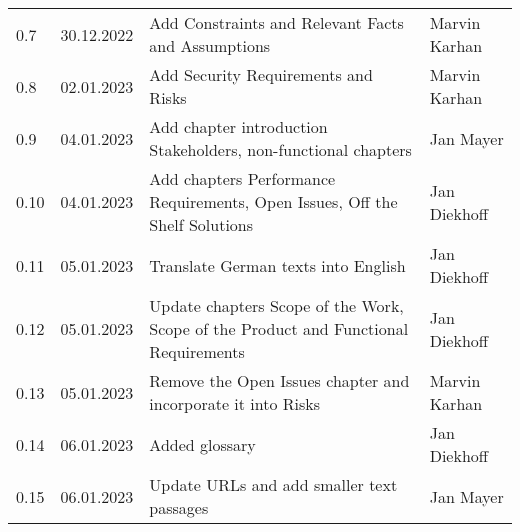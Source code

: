 \begin{footnotesize}
\begin{longtable}[L L L L]{ p{} p{} p{} p{} }
    0.7              & 30.12.2022    & Add Constraints and Relevant Facts and Assumptions                                                                                            & Marvin Karhan   \\

    \rowcolor{Gray}
    0.8              & 02.01.2023    & Add Security Requirements and Risks                                                                                                           & Marvin Karhan   \\

    0.9              & 04.01.2023    & Add chapter introduction Stakeholders, non-functional chapters                                                                                & Jan Mayer       \\

    \rowcolor{Gray}
    0.10             & 04.01.2023    & Add chapters Performance Requirements, Open Issues, Off the Shelf Solutions                                                                   & Jan Diekhoff    \\

    0.11             & 05.01.2023    & Translate German texts into English                                                                                                           & Jan Diekhoff    \\

    \rowcolor{Gray}
    0.12             & 05.01.2023    & Update chapters Scope of the Work, Scope of the Product and Functional Requirements                                                           & Jan Diekhoff    \\

    0.13             & 05.01.2023    & Remove the Open Issues chapter and incorporate it into Risks                                                                           & Marvin Karhan   \\

    \rowcolor{Gray}
    0.14             & 06.01.2023    & Added glossary                                                                                                                                & Jan Diekhoff    \\

    0.15             & 06.01.2023    & Update URLs and add smaller text passages                                                                                                     & Jan Mayer       \\
    

\end{longtable}
\end{footnotesize}
